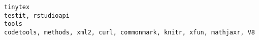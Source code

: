 \documentclass[
  letterpaper,
  DIV=11,
  numbers=noendperiod]{scrreprt}
\begin{document}
\begin{verbatim}
tinytex                                                                                                                                                                                                                                                                                                                                                                                                                                                                                                                                                                                                                                                                                                                                                                                                                                                                                                                                                                                                                                                                                                                                                                                                                                                                                    testit, rstudioapi
tools                                                                                                                                                                                                                                                                                                                                                                                                                                                                                                                                                                                                                                                                                                                                                                                                                                                                                                                                                                                                                                                                                                                                                                                                                                   codetools, methods, xml2, curl, commonmark, knitr, xfun, mathjaxr, V8

\end{verbatim}
\end{document}
